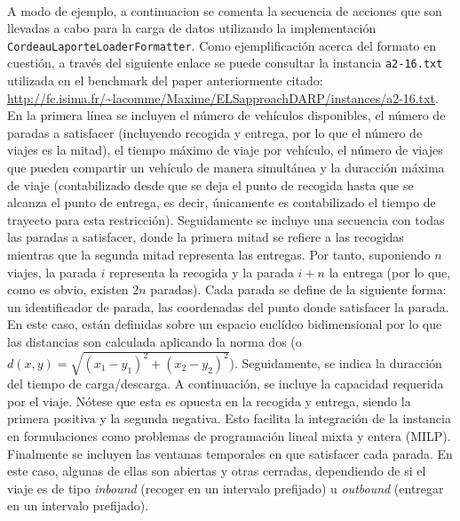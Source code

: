 \documentclass{subfiles}
\begin{document}
          \paragraph{}
          A modo de ejemplo, a continuacion se comenta la secuencia de acciones que son llevadas a cabo para la carga de datos utilizando la implementación \texttt{CordeauLaporteLoaderFormatter}. Como ejemplificación acerca del formato en cuestión, a través del siguiente enlace se puede consultar la instancia \texttt{a2-16.txt} utilizada en el benchmark del paper anteriormente citado: \url{http://fc.isima.fr/~lacomme/Maxime/ELSapproachDARP/instances/a2-16.txt}. En la primera línea se incluyen el número de vehículos disponibles, el número de paradas a satisfacer (incluyendo recogida y entrega, por lo que el número de viajes es la mitad), el tiempo máximo de viaje por vehículo, el número de viajes que pueden compartir un vehículo de manera simultánea y la duracción máxima de viaje (contabilizado desde que se deja el punto de recogida hasta que se alcanza el punto de entrega, es decir, únicamente es contabilizado el tiempo de trayecto para esta restricción). Seguidamente se incluye una secuencia con todas las paradas a satisfacer, donde la primera mitad se refiere a las recogidas mientras que la segunda mitad representa las entregas. Por tanto, suponiendo $n$ viajes, la parada $i$ representa la recogida y la parada $i + n$ la entrega (por lo que, como es obvio, existen $2n$ paradas). Cada parada se define de la siguiente forma: un identificador de parada, las coordenadas del punto donde satisfacer la parada. En este caso, están definidas sobre un espacio euclídeo bidimensional por lo que las distancias son calculada aplicando la norma dos (o $d(x, y) = \sqrt{(x_{1} - y_{1}) ^ 2 + (x_{2} - y_{2}) ^ 2}$). Seguidamente, se indica la duracción del tiempo de carga/descarga. A continuación, se incluye la capacidad requerida por el viaje. Nótese que esta es opuesta en la recogida y entrega, siendo la primera positiva y la segunda negativa. Esto facilita la integración de la instancia en formulaciones como problemas de programación lineal mixta y entera (MILP). Finalmente se incluyen las ventanas temporales en que satisfacer cada parada. En este caso, algunas de ellas son abiertas y otras cerradas, dependiendo de si el viaje es de tipo \emph{inbound} (recoger en un intervalo prefijado) u \emph{outbound} (entregar en un intervalo prefijado).
\end{document}
